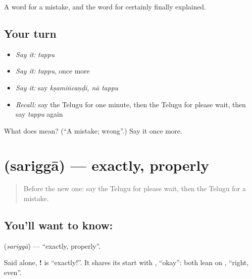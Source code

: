 \begin{grammarlens}[title={What you've built}]
A word for a mistake, and the word for certainly finally explained.
\end{grammarlens}

\subsection*{Your turn}
\begin{itemize}
\raggedright
  \item \emph{Say it:} \emph{tappu}
  \item \emph{Say it:} \emph{tappu}, once more
  \item \emph{Say it:} say \emph{kṣamin̄caṇḍi, nā tappu}
  \item \emph{Recall:} say the Telugu for one minute, then the Telugu for please wait, then say \emph{tappu} again
\end{itemize}

\begin{tcolorbox}[breakable,colback=teal!4,colframe=teal!35!black,title={Before you move on}]
What does  mean? (\textquotedblleft{}A mistake; wrong\textquotedblright{}.) Say it once more.
\end{tcolorbox}
\section[\texorpdfstring{\te{సరిగ్గా} (sariggā)}{సరిగ్గా (sariggā)}]{ (sariggā) — exactly, properly}

\label{lesson:TE-C87-exactly}



\begin{quote}
Before the new one: say the Telugu for please wait, then the Telugu for a mistake.
\end{quote}

\subsection*{You'll want to know: }
\textbf{} (\emph{sariggā}) — \textquotedblleft{}exactly, properly\textquotedblright{}.

Said alone, \textbf{!} is \textquotedblleft{}exactly!\textquotedblright{}. It shares its start with \textbf{}, \textquotedblleft{}okay\textquotedblright{}: both lean on \textbf{}, \textquotedblleft{}right, even\textquotedblright{}.

